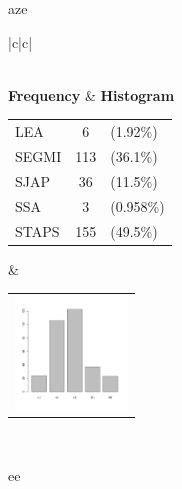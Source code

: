 


 aze 
  \begin{center}
    \addtolength{\leftskip}{-4cm}\addtolength{\rightskip}{-4cm}
    \begin{tabular}{|c|c|}

      \hline
        \\
      \hline
        {\bf Frequency} & {\bf Histogram}  \\
          \begin{tabular}{@{}l@{ : }cl@{}}
            LEA & 6 &(1.92\%) \\
            SEGMI & 113 &(36.1\%) \\
            SJAP & 36 &(11.5\%) \\
            SSA & 3 &(0.958\%) \\
            STAPS & 155 &(49.5\%) \\
          \end{tabular}
      &
          \begin{tabular}{@{}l@{}}
            \includegraphics[width=3cm]{graphUniv/V-barplot}
          \end{tabular}
      \\ \hline 

    \end{tabular}
  \end{center}
  
 ee 

